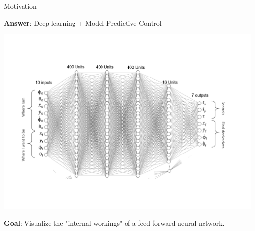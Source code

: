 \documentclass[final,hyperref={pdfpagelabels=false}]{beamer}
\begin{document}
\begin{frame}{}
\begin{columns}[t]
\begin{column}{.32\linewidth}
\begin{block}{Motivation}
\begin{center}
\end{center}
\noindent   \textbf{ Answer}: Deep learning + Model Predictive Control 
\begin{center}
\includegraphics[scale=0.9]{s2.pdf}
\end{center}         
\noindent       \textbf{ Goal}:   Visualize the "internal workings" of a feed forward neural network.        
   \end{block}

    \vfill
   \end{column}


\end{columns}
\end{frame}
\end{document}
